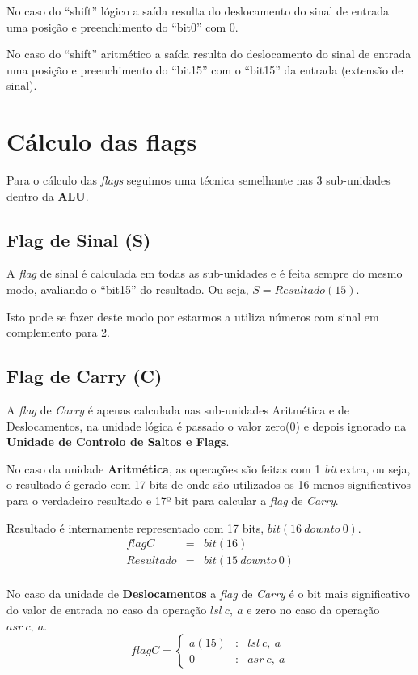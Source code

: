 No caso do ``shift'' lógico a saída resulta do deslocamento do sinal de entrada uma posição e preenchimento do ``bit0'' com 0.\par
No caso do ``shift'' aritmético a saída resulta do deslocamento do sinal de entrada uma posição e preenchimento do ``bit15'' com o ``bit15'' da entrada (extensão de sinal).

\section{Cálculo das flags}
Para o cálculo das \textit{flags} seguimos uma técnica semelhante nas 3 sub-unidades dentro da \textbf{ALU}.

\subsection{Flag de Sinal (S)}
A \textit{flag} de sinal é calculada em todas as sub-unidades e é feita sempre do mesmo modo, avaliando o ``bit15'' do resultado. Ou seja, \mbox{$S=Resultado(15)$}.\par
Isto pode se fazer deste modo por estarmos a utiliza números com sinal em complemento para 2.

\subsection{Flag de Carry (C)}
A \textit{flag} de \textit{Carry} é apenas calculada nas sub-unidades Aritmética e de Deslocamentos, na unidade lógica é passado o valor zero(0) e depois ignorado na \textbf{Unidade de Controlo de Saltos e Flags}.\par
No caso da unidade \textbf{Aritmética}, as operações são feitas com 1 \textit{bit} extra, ou seja, o resultado é gerado com 17 bits de onde são utilizados os 16 menos significativos para o verdadeiro resultado e 17º bit para calcular a \textit{flag} de \textit{Carry}.\par
Resultado é internamente representado com 17 bits, \mbox{$bit(16\ downto\ 0)$}.
\[\begin{array}{rcl}
flagC & = & bit(16)\\
Resultado & = & bit(15\ downto\ 0)\\
\end{array}
\]\par
No caso da unidade de \textbf{Deslocamentos} a \textit{flag} de \textit{Carry} é o bit mais significativo do valor de entrada no caso da operação \mbox{$lsl\ c,\ a$} e zero no caso da operação \mbox{$asr\ c,\ a$}.
\[ flagC=\left\{
\begin{array}{rcl}
a(15) & : & lsl\ c,\ a\\
0 & : & asr\ c,\ a
\end{array}
\right.\]\par

